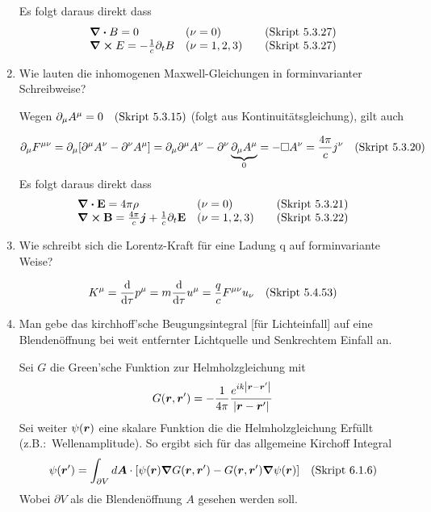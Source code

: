 \begin{enumerate}
    Es folgt daraus direkt dass
    \begin{equation*}
      \begin{array}{lll}
        \div B = 0 & (\nu = 0) & \quad\text{(Skript 5.3.27)} \\
        \curl E = -\frac{1}{c}\partial_t B & (\nu = 1,2,3) 
                                           & \quad\text{(Skript 5.3.27)} 
      \end{array}
    \end{equation*}

  \item Wie lauten die inhomogenen Maxwell-Gleichungen in %
    forminvarianter Schreibweise?

    Wegen $\partial_\mu A^\mu=0 \quad\text{(Skript 5.3.15)}$ 
    (folgt aus Kontinuitätsgleichung), gilt auch
    
    \begin{equation*}
      \partial_\mu F^{\mu\nu}
      =\partial_\mu\qty[\partial^\mu A^\nu-\partial^\nu A^\mu]
      =\partial_\mu\partial^\mu A^\nu - \partial^\nu 
      \underbrace{\partial_\mu A^\mu}_{0}
      =-\square A^\nu = \frac{4\pi}{c}j^\nu \quad\text{(Skript 5.3.20)} 
    \end{equation*}
    Es folgt daraus direkt dass
    \begin{equation*}
      \begin{array}{lll}
        \div \vb E = 4\pi \rho &(\nu=0) &\quad\text{(Skript 5.3.21)}\\
        \curl \vb B = \frac{4\pi}{c}\vb* j + \frac{1}{c}\partial_t \vb E
                    &(\nu=1,2,3) &\quad\text{(Skript 5.3.22)}
      \end{array}
    \end{equation*}

  \item Wie schreibt sich die Lorentz-Kraft für eine Ladung q auf %
     forminvariante Weise?

    \begin{equation*}
      K^\mu=\dv \tau p^\mu =m \dv \tau u^\mu = \frac{q}{c} F^{\mu\nu}u_\nu
      \quad\text{(Skript 5.4.53)}
    \end{equation*}

  \clearpage
  \item Man gebe das kirchhoff'sche Beugungsintegral [für %
    Lichteinfall] auf eine Blendenöffnung bei weit 
    entfernter Lichtquelle und Senkrechtem Einfall an.
    
    Sei $G$ die Green'sche Funktion zur Helmholzgleichung mit
    \begin{equation*}
      G(\vb* r, \vb* r')
      =-\frac{1}{4\pi}\frac{e^{ik\abs{\vb* r -\vb* r'}}}{\abs{\vb* r - \vb* r'}}
    \end{equation*}
    Sei weiter $\psi(\vb* r)$ eine skalare Funktion die die Helmholzgleichung
    Erfüllt (z.B.:\ Wellenamplitude).
    So ergibt sich für das allgemeine Kirchoff Integral
    \begin{equation*}
      \psi(\vb* r')=\int_{\partial V} d\vb* A 
      \cdot 
      \qty[\psi(\vb* r)\grad G(\vb* r, \vb* r')-
      G(\vb* r, \vb* r')\grad\psi(\vb* r)]
      \quad\text{(Skript 6.1.6)}
    \end{equation*}
    Wobei $\partial V$ als die Blendenöffnung $A$ gesehen werden soll.


\end{enumerate}
